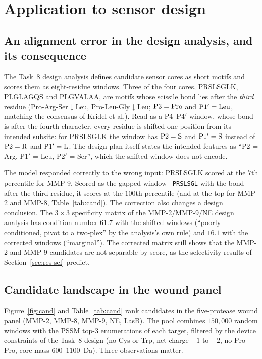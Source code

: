 \section{Application to sensor design}
\label{sec:design}

\subsection{An alignment error in the design analysis, and its consequence}
The Task~8 design analysis defines candidate sensor cores as short motifs and scores them as eight-residue windows. Three of the four cores, PRSLSGLK, PLGLAGQS and PLGVALAA, are motifs whose scissile bond lies after the \emph{third} residue (Pro-Arg-Ser$\downarrow$Leu, Pro-Leu-Gly$\downarrow$Leu; $\mathrm{P}3=\mathrm{Pro}$ and $\mathrm{P}1'=\mathrm{Leu}$, matching the consensus of Kridel et al.). Read as a P4--P4$'$ window, whose bond is after the fourth character, every residue is shifted one position from its intended subsite: for PRSLSGLK the window has $\mathrm{P}2=\mathrm{S}$ and $\mathrm{P}1'=\mathrm{S}$ instead of $\mathrm{P}2=\mathrm{R}$ and $\mathrm{P}1'=\mathrm{L}$. The design plan itself states the intended features as ``P2 = Arg, P1$'$ = Leu, P2$'$ = Ser'', which the shifted window does not encode.

The model responded correctly to the wrong input: PRSLSGLK scored at the $7$th percentile for MMP-9. Scored as the gapped window \texttt{-PRSLSGL} with the bond after the third residue, it scores at the $100$th percentile (and at the top for MMP-2 and MMP-8, Table~\ref{tab:cand}). The correction also changes a design conclusion. The $3\times3$ specificity matrix of the MMP-2/MMP-9/NE design analysis has condition number $61.7$ with the shifted windows (``poorly conditioned, pivot to a two-plex'' by the analysis's own rule) and $16.1$ with the corrected windows (``marginal''). The corrected matrix still shows that the MMP-2 and MMP-9 candidates are not separable by score, as the selectivity results of Section~\ref{sec:res-sel} predict.

\begin{table}[!htbp]
\centering\small
\caption{Task~8 candidates scored in the MMP-2/MMP-9/NE panel with correctly aligned, gapped windows. ``Pool percentile'' is the percentile of the margin within the PSSM top-3 enumeration pool for the target (same gap pattern).}
\label{tab:design}
\end{table}

\subsection{Candidate landscape in the wound panel}
Figure~\ref{fig:cand} and Table~\ref{tab:cand} rank candidates in the five-protease wound panel (MMP-2, MMP-8, MMP-9, NE, LasB). The pool combines $150{,}000$ random windows with the PSSM top-3 enumerations of each target, filtered by the device constraints of the Task~8 design (no Cys or Trp, net charge $-1$ to $+2$, no Pro-Pro, core mass $600$--$1100$~Da). Three observations matter.

